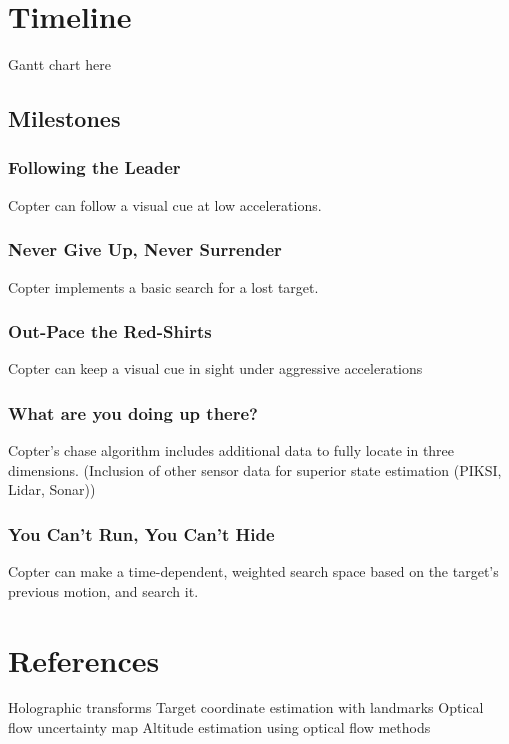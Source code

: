 \documentclass[11pt]{article}
\begin{document}
  \section{Timeline}
    Gantt chart here
    \subsection{Milestones}

    \subsubsection{Following the Leader}
      Copter can follow a visual cue at low accelerations.

    \subsubsection{Never Give Up, Never Surrender}
      Copter implements a basic search for a lost target.

    \subsubsection{Out-Pace the Red-Shirts}
      Copter can keep a visual cue in sight under aggressive accelerations

    \subsubsection{What are you doing up there?}
      Copter's chase algorithm includes additional data to fully locate in three dimensions.
        (Inclusion of other sensor data for superior state estimation (PIKSI, Lidar, Sonar))

    \subsubsection{You Can't Run, You Can't Hide}
      Copter can make a time-dependent, weighted search space based on the target's previous motion, and search it.


  \section{References}
    Holographic transforms
    Target coordinate estimation with landmarks
    Optical flow uncertainty map
    Altitude estimation using optical flow methods











	
\end{document}
